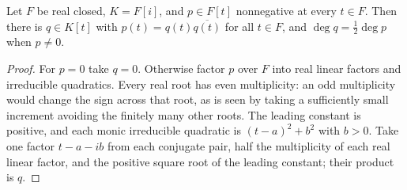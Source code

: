 \documentclass[11pt,letterpaper]{article}
\numberwithin{equation}{section}
\theoremstyle{definition}
\theoremstyle{remark}
\begin{document}
\begin{lemma}\label{trigonometry:lem:twosquares}
Let $F$ be real closed, $K=F[i]$, and $p\in F[t]$ nonnegative at every $t\in F$. Then there is
$q\in K[t]$ with $p(t)=q(t)\overline{q(t)}$ for all $t\in F$, and $\deg q=\tfrac12\deg p$ when
$p\ne0$.
\end{lemma}
\begin{proof}
For $p=0$ take $q=0$. Otherwise factor $p$ over $F$ into real linear factors and irreducible
quadratics. Every real root has even multiplicity: an odd multiplicity would change the sign across
that root, as is seen by taking a sufficiently small increment avoiding the finitely many other
roots. The leading constant is positive, and each monic irreducible quadratic is $(t-a)^2+b^2$ with
$b>0$. Take one factor $t-a-ib$ from each conjugate pair, half the multiplicity of each real linear
factor, and the positive square root of the leading constant; their product is $q$.
\end{proof}
\end{document}
